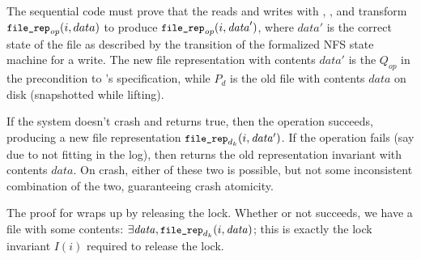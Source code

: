 The sequential code must prove that the reads and writes with ,
, and  transform $\cc{file_rep}_{\mathit{op}}(i, data)$ to
produce $\cc{file_rep}_{\mathit{op}}(i, \mathit{data}')$, where $data'$ is the correct state of
the file as described by the transition of the formalized NFS state machine for a write. The new
file representation with contents $data'$ is the $Q_{\mathit{op}}$ in the precondition
to 's specification, while $P_{d}$ is the old file with contents
$\mathit{data}$ on disk (snapshotted while lifting).

If the system doesn't crash and  returns true, then the operation
succeeds, producing a new file representation
$\cc{file_rep}_{d_{k}}(i, \mathit{data'})$. If the operation fails (say due to
not fitting in the log), then  returns the old representation
invariant with contents $\mathit{data}$. On crash, either of these two is
possible, but not some inconsistent combination of the two, guaranteeing crash atomicity.

The proof for  wraps up by releasing the lock. Whether or not
 succeeds, we have a file with some contents:
$\exists \mathit{data}, \cc{file_rep}_{d_{k}}(i, \mathit{data})$; this is
exactly the lock invariant $I(i)$ required to release the lock.

